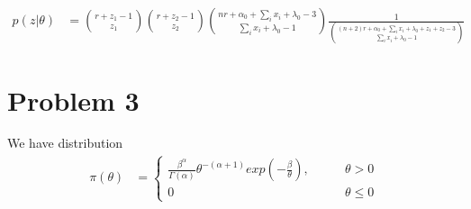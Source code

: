 \documentclass[11pt]{article} %
\begin{document}
\begin{itemize}
\begin{align*}
	p(z | \theta) & =  {r+z_1-1 \choose z_1} {r+z_2-1 \choose z_2} {nr+\alpha_0+ \sum_i x_i + \lambda_0-3 \choose \sum_i x_i + \lambda_0-1} \frac{1}{{(n+2) r + \alpha_0 + \sum_i x_i + \lambda_0 + z_1+z_2 -3 \choose \sum_i x_i + \lambda_0-1}}
\end{align*}

\end{itemize}

\section{Problem 3}
We have distribution 
\begin{align}
	\pi(\theta) &= \begin{cases} 
		\frac{\beta^{\alpha} }{\Gamma(\alpha)} \theta^{-(\alpha + 1)} exp(-\frac{\beta}{\theta}), & \qquad \theta > 0 \\
		0 & \qquad \theta \leq 0
		\end{cases} 
	\label{eq:1}
\end{align}
\end{document}
